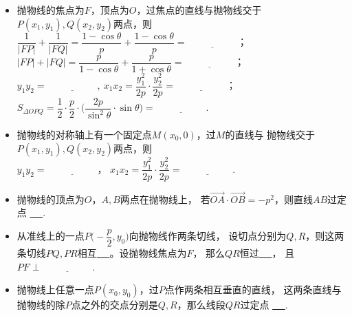 \documentclass{article}
\newif\ifte
\renewcommand{\vec}{\overrightarrow}
\begin{document}
\begin{multicols}{2}
\begin{enumerate}[leftmargin=20pt]
\begin{itemize}[leftmargin=-4pt]
\item 抛物线的焦点为$ F $，顶点为$ O $，过焦点的直线与抛物线交于$ P(x_1,y_1),
Q(x_2,y_2) $两点，则 \\ $ \dfrac{1}{|FP|}+\dfrac{1}{|FQ|}=
\dfrac{1-\cos\theta}{p}+\dfrac{1-\cos\theta}{p}=
\underline{\ \ifte \dfrac{2}{p}\else \hspace{2cm} \fi\ } $；\\
$ |FP|+|FQ|=\dfrac{p}{1-\cos\theta}+\dfrac{p}{1+\cos\theta}
=\underline{\ \ifte \dfrac{2p}{\sin^2\theta}\else \hspace{2cm} \fi\ } $；\\
$ y_1y_2=\underline{\ \ifte -p^2 \else \hspace{2cm} \fi\ },\ 
x_1x_2=\dfrac{y_1^2}{2p}\cdot \dfrac{y_2^2}{2p}=
\underline{\ \ifte \dfrac{p^2}{4}\else \hspace{2cm} \fi\ } $；\\
$ S_{\Delta OPQ}=\dfrac{1}{2}\cdot \dfrac{p}{2}\cdot\Big(\dfrac{2p}{\sin^2\theta}\cdot \sin\theta\Big)=
\underline{\ \ifte \dfrac{p^2}{2\sin\theta}\else \hspace{2cm} \fi\ } $.

\item 抛物线的对称轴上有一个固定点$ M(x_0,0) $，过$ M $的直线与
抛物线交于$ P(x_1,y_1),Q(x_2,y_2) $两点，则\\ $ y_1y_2=
\underline{\ \ifte -2px_0\else \hspace{2cm} \fi\ } $，
$ x_1x_2=\dfrac{y_1^2}{2p}\cdot \dfrac{y_2^2}{2p}=
\underline{\ \ifte x_0^2\else \hspace{2cm} \fi\ } $.

\item 抛物线的顶点为$ O $，$ A,B $两点在抛物线上，
若$ \vec{OA}\cdot\vec{OB}=-p^2 $，则直线$ AB $过定点
\underline{\ \ifte $ (p,0) $\else \hspace{2cm} \fi\ }.

\item 从准线上的一点$ P\Big(-\dfrac{p}{2},y_0\Big) $向抛物线作两条切线，
设切点分别为$ Q,R $，则这两条切线$ PQ,PR $相互\underline{\ 
    \ifte 垂直\else \hspace{2cm} \fi\ }。设抛物线焦点为$ F $，
那么$ QR $恒过\underline{\ \ifte 焦点 \else \hspace{2cm} \fi\ }，
且$ PF\perp \underline{\ \ifte QR\else \hspace{2cm} \fi\ } $.

\item 抛物线上任意一点$ P(x_0,y_0) $，过$ P $点作两条相互垂直的直线，
这两条直线与抛物线的除$ P $点之外的交点分别是$ Q,R $，那么线段$ QR $过定点
\underline{\ \ifte $ (x_0+2p,-y_0) $\else \hspace{2cm} \fi\ }.


\end{itemize}
\end{enumerate}
\end{multicols}
\end{document}
